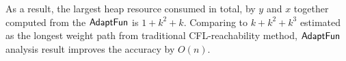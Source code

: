 \begin{example}
%
As a result,
the largest heap resource consumed in total, by $y$ and $x$ together computed from the $\textsf{AdaptFun}$ is $1 + k^2 + k$.
Comparing to $k + k^2 + k^3$ estimated as  the longest weight path from traditional CFL-reachability method, 
$\textsf{AdaptFun}$ analysis result improves the accuracy by $O(n)$.


\end{example}
